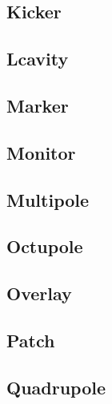 \subsection{Kicker}
\label{s:k}

\subsection{Lcavity}
\label{s:lcav}

\subsection{Marker}
\label{s:mark}

\subsection{Monitor}
\label{s:mon}

\subsection{Multipole}
\label{s:m}

\subsection{Octupole}
\label{s:oct}

\subsection{Overlay}
\label{s:over}

\subsection{Patch}
\label{s:patch}

\subsection{Quadrupole}
\label{s:quad}

